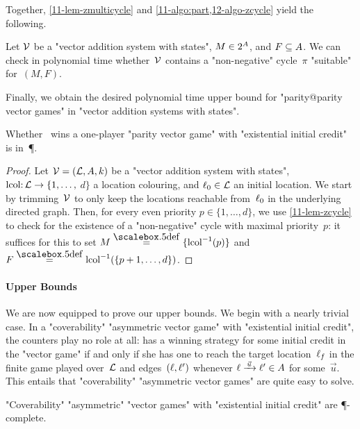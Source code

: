 \begin{scope}
Together, \cref{11-lem-zmulticycle}
and \cref{11-algo:part,12-algo-zcycle} yield the following.

\begin{lemma}\label{11-lem-zcycle}
  Let $\mathcal V$ be a "vector addition system with states",
  $M\in 2^{A}$, and $F\subseteq A$.  We can check in polynomial
  time whether~$\mathcal V$ contains a "non-negative" cycle~$\pi$
  "suitable" for~$(M,F)$.
\end{lemma}

Finally, we obtain the desired polynomial time upper bound for
"parity@parity vector games" in "vector addition systems with states".
\begin{theorem}\label{11-thm-zcycle}
  Whether \Eve\ wins a one-player "parity vector game" with
  "existential initial credit" is in~\P.
\end{theorem}
\begin{proof}
  Let $\mathcal V=(\mathcal L,A,k)$ be a "vector addition system with states",
  $\mathrm{lcol}{:}\,\mathcal L\to\{1,\dots,$ $d\}$ a location colouring, and
  $\ell_0\in\mathcal L$ an initial location.  We start by trimming~$\mathcal V$ to
  only keep the locations reachable from~$\ell_0$ in the underlying
  directed graph.  Then, for every even priority $p\in\{1,\dots,d\}$,
  we use \cref{11-lem-zcycle} to check for the existence of a
  "non-negative" cycle with maximal priority~$p$: it suffices for this
  to set $M\eqdef\{\lcol^{-1}(p)\}$ and
  $F\eqdef\lcol^{-1}(\{p+1,\dots,d\})$.
\end{proof}
\end{scope}

\paragraph{Upper Bounds}
We are now equipped to prove our upper bounds.  We begin with a nearly
trivial case.  In a "coverability" "asymmetric vector game" with
"existential initial credit", the counters play no role at all: \Eve
has a winning strategy for some initial credit in the "vector game" if
and only if she has one to reach the target location~$\ell_f$ in the
finite game played over~$\mathcal L$ and edges~$(\ell,\ell')$ whenever
$\loc\step{\vec u}\loc'\in\Act$ for some~$\vec u$.  This entails that
"coverability" "asymmetric vector games" are quite easy to solve.

\begin{theorem}\label{11-cov-exist-P}
  "Coverability" "asymmetric" "vector games" with "existential initial
  credit" are \P-complete.
\end{theorem}

